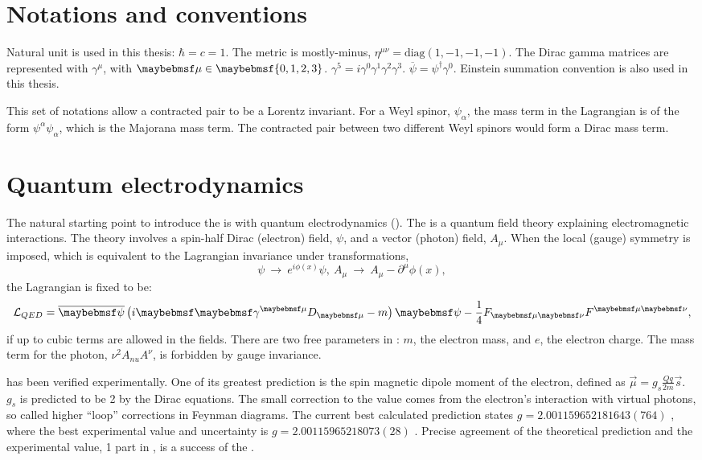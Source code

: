 \section{Notations and conventions}

Natural unit is used in this thesis: $\hbar = c = 1$. The metric is mostly-minus, $\eta^{\mu\nu} = \text{diag}(1,-1,-1,-1)$. The Dirac gamma matrices are represented with $\gamma^{\mu}$, with $\mu\in\braces{0,1,2,3}$. $\gamma^5 = i \gamma^{0}\gamma^{1}\gamma^{2}\gamma^{3}$. $\overline{\psi} = \psi^{\dagger}\gamma^0$. Einstein summation convention is also used in this thesis.

This set of notations allow a contracted pair to be a Lorentz invariant. For a Weyl spinor, $\psi_\alpha$, the mass term in the Lagrangian is of the form $\psi^{\alpha}\psi_\alpha$, which is the Majorana mass term. The contracted pair between two different Weyl spinors would form a Dirac mass term.


\section{Quantum electrodynamics}

The natural starting point to introduce the \SM is with quantum electrodynamics (\QED). The \QED is a quantum field theory explaining electromagnetic interactions. The theory involves a spin-half Dirac (electron) field, $\psi$, and a vector (photon) field, $A_{\mu}$. When the local (gauge) symmetry is imposed, which is equivalent to the Lagrangian invariance under transformations,
\begin{equation}
\psi\ \to\ e^{i\phi(x)}\psi,\ A_{\mu}\ \to\ A_{\mu} - \partial^{\mu}\phi(x),
\end{equation}
the Lagrangian is fixed to be:
\begin{equation}
\Lagr_{QED} = \overline{\psi} \left( i\Dstroke - m \right)\psi -  \frac{1}{4}F_{\mu\nu}F^{\mu\nu},
\end{equation}
if up to cubic terms are allowed in the fields. There are two free parameters in \QED: $m$, the electron mass, and $e$, the electron charge. The mass term for the photon, $\nu^{2}A_{nu}A^{\nu}$, is forbidden by gauge invariance.

\QED has been verified experimentally. One of its greatest prediction is the spin magnetic dipole moment of the electron, defined as $\vec{\mu} = g_{s}\frac{Qq}{2m} \vec{s}$. $g_{s}$ is predicted to be 2 by the Dirac equations. The small correction to the value comes from the electron's interaction with virtual photons, so called higher ``loop'' corrections in Feynman diagrams. The current best calculated \QED prediction states $g=2.001159652181643(764)$ \cite{Aoyama:2014sxa}, where the best experimental value and uncertainty is $g = 2.00115965218073(28)$ \cite{Hanneke:2010au}. Precise agreement of the theoretical prediction and the experimental value, 1 part in , is a success of the \QED.

